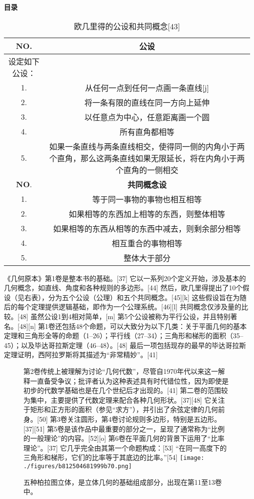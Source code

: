 \textbf{目录}

\begin{table}[ht]
\centering
\caption{欧几里得的公设和共同概念[43]}\label{Euclid}
\begin{tabular}{|c|c}
\hline \textbf{NO}.& \textbf{公设}\\
\hline 设定如下公设：& \\
\hline 1. & 从任何一点到任何一点画一条直线[j]\\ 
\hline 2. & 将一条有限的直线在同一方向上延伸 \\ 
\hline 3. & 以任意点为中心，任意距离画一个圆 \\ 
\hline 4. & 所有直角都相等\\  
\hline 5. & 如果一条直线与两条直线相交，使得同一侧的内角小于两个直角，那么这两条直线如果无限延长，将在内角小于两个直角的一侧相交\\
\hline \textbf{NO}.& \textbf{共同概念设}\\
\hline 1. & 等于同一事物的事物也相互相等\\  
\hline 2. & 如果相等的东西加上相等的东西，则整体相等\\  
\hline 3. & 如果相等的东西从相等的东西中减去，则剩余部分相等\\  
\hline 4. & 相互重合的事物相等\\  
\hline 5. & 整体大于部分\\
\hline 
\end{tabular}
\end{table}
《几何原本》第1卷是整本书的基础。[37] 它以一系列20个定义开始，涉及基本的几何概念，如直线、角度和各种规则的多边形。[44] 然后，欧几里得提出了10个假设（见右表），分为五个公设（公理）和五个共同概念。[45][k] 这些假设旨在为随后的每个定理提供逻辑基础，即作为一个公理系统。[46][l] 共同概念仅涉及量的比较。[48] 虽然公设1到4相对简单，[m] 第5个公设被称为平行公设，并且特别著名。[48][n] 第1卷还包括48个命题，可以大致分为以下几类：关于平面几何的基本定理和三角形全等的命题（1–26）；平行线（27–34）；三角形和梯形的面积（35–45）；以及毕达哥拉斯定理（46–48）。[48] 最后一项包括现存的最早的毕达哥拉斯定理证明，西阿拉罗斯将其描述为“非常精妙”。[41]\begin{figure}[ht]

第2卷传统上被理解为讨论“几何代数”，尽管自1970年代以来这一解释一直备受争议；批评者认为这种表述具有时代错位性，因为即使是初步的代数学基础也是在几个世纪后才出现的。[41] 第二卷的范围较为集中，主要提供了代数定理来配合各种几何形状。[37][48] 它关注于矩形和正方形的面积（参见“求方”），并引出了余弦定律的几何前身。[50] 第3卷关注圆形，第4卷讨论规则多边形，特别是五边形。[37][51] 第5卷是该作品中最重要的部分之一，呈现了通常称为“比例的一般理论”的内容。[52][o] 第6卷在平面几何的背景下运用了“比率理论”。[37] 它几乎完全由其第一个命题构成：[53] “在同一高度下的三角形和梯形，它们的比率等于其底边的比率。”[54]
\centering
\texttt{[image: ./figures/b812504681999b70.png]}
\caption{五种柏拉图立体，是立体几何的基础组成部分，出现在第11至13卷中。} \label{fig_Euclid_5}
\end{figure}
